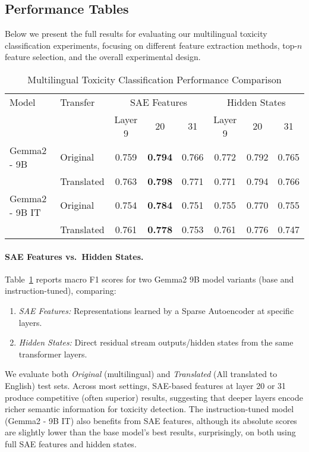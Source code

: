 \FloatBarrier
\newpage

\subsection{Performance Tables}
\label{app:performance_table}

Below we present the full results for evaluating our multilingual toxicity classification experiments, focusing on different feature extraction methods, top-$n$ feature selection, and the overall experimental design. 

\begin{table}[ht]
\centering
\caption{Multilingual Toxicity Classification Performance Comparison}
\label{tab:results}
\begin{tabular}{l l c c c c c c}
\toprule
Model & Transfer & \multicolumn{3}{c}{SAE Features} & \multicolumn{3}{c}{Hidden States} \\
 & & Layer 9 & 20 & 31 & Layer 9 & 20 & 31 \\
\midrule
Gemma2 - 9B & Original   & 0.759 & \textbf{0.794} & 0.766 & 0.772 & 0.792 & 0.765 \\
 & Translated              & 0.763 & \textbf{0.798} & 0.771 & 0.771 & 0.794 & 0.766 \\
Gemma2 - 9B IT & Original & 0.754 & \textbf{0.784} & 0.751 & 0.755 & 0.770 & 0.755 \\
 & Translated              & 0.761 & \textbf{0.778} & 0.753 & 0.761 & 0.776 & 0.747 \\
\bottomrule
\end{tabular}
\end{table}

\paragraph{SAE Features vs.\ Hidden States.}
Table~\ref{tab:results} reports macro F1 scores for two Gemma2 9B model variants (base and instruction-tuned), comparing:
\begin{enumerate}
    \item \textit{SAE Features:} Representations learned by a Sparse Autoencoder at specific layers.
    \item \textit{Hidden States:} Direct residual stream outputs/hidden states from the same transformer layers.
\end{enumerate}
We evaluate both \emph{Original} (multilingual) and \emph{Translated} (All translated to English) test sets. 
Across most settings, SAE-based features at layer 20 or 31 produce competitive (often superior) results, suggesting that deeper layers encode richer semantic information for toxicity detection. 
The instruction-tuned model (Gemma2 - 9B IT) also benefits from SAE features, although its absolute scores are slightly lower than the base model’s best results, surprisingly, on both using full SAE features and hidden states.


